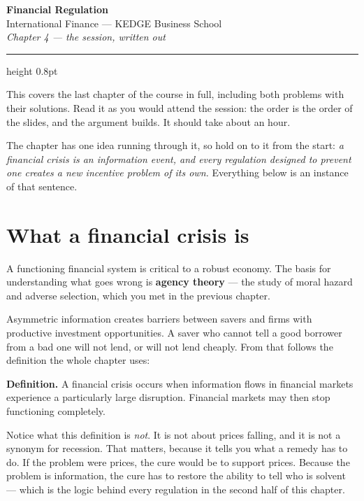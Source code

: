 \documentclass[11pt,a4paper]{article}
\newcommand{\keylab}[1]{\textcolor{ifclay}{\textbf{#1}}}
\begin{document}
\begin{center}
{\color{ifteal}\Huge\bfseries Financial Regulation}\\[5pt]
{\color{ifgrey}\large International Finance --- KEDGE Business School}\\[3pt]
{\color{ifgrey}\itshape Chapter 4 --- the session, written out}
\end{center}
\vspace{5pt}
{\color{ifrule}\hrule height 0.8pt}
\vspace{7pt}

This covers the last chapter of the course in full, including both problems with
their solutions. Read it as you would attend the session: the order is the order
of the slides, and the argument builds. It should take about an hour.

The chapter has one idea running through it, so hold on to it from the start:
\emph{a financial crisis is an information event, and every regulation designed
to prevent one creates a new incentive problem of its own.} Everything below is
an instance of that sentence.

\section{What a financial crisis is}

A functioning financial system is critical to a robust economy. The basis for
understanding what goes wrong is \textbf{agency theory} --- the study of moral
hazard and adverse selection, which you met in the previous chapter.

Asymmetric information creates barriers between savers and firms with productive
investment opportunities. A saver who cannot tell a good borrower from a bad one
will not lend, or will not lend cheaply. From that follows the definition the
whole chapter uses:

\begin{keybox}
\keylab{Definition.} A financial crisis occurs when information flows in
financial markets experience a particularly large disruption. Financial markets
may then stop functioning completely.
\end{keybox}

Notice what this definition is \emph{not}. It is not about prices falling, and
it is not a synonym for recession. That matters, because it tells you what a
remedy has to do. If the problem were prices, the cure would be to support
prices. Because the problem is information, the cure has to restore the ability
to tell who is solvent --- which is the logic behind every regulation in the
second half of this chapter.
\end{document}
